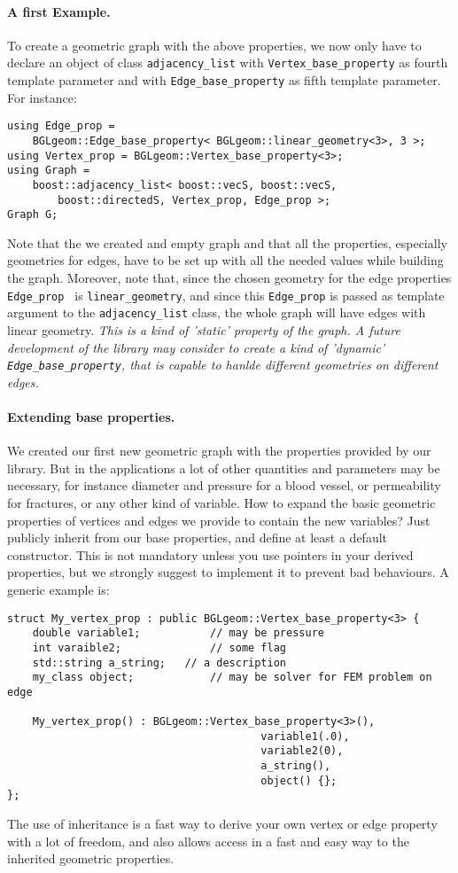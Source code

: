 \documentclass[11pt]{article} %
\newcommand{\classname}[1]{\texttt{#1}}
\begin{document}
		\paragraph{A first Example.} To create a geometric graph with the above properties, we now only have to declare an object of class \classname{adjacency\_list} with \classname{Vertex\_base\_property} as fourth template parameter and with \classname{Edge\_base\_property} as fifth template parameter. For instance:
\begin{lstlisting}[frame=single]
using Edge_prop = 
	BGLgeom::Edge_base_property< BGLgeom::linear_geometry<3>, 3 >;
using Vertex_prop = BGLgeom::Vertex_base_property<3>;
using Graph = 
	boost::adjacency_list< boost::vecS, boost::vecS, 
		boost::directedS, Vertex_prop, Edge_prop >;
Graph G;
\end{lstlisting}
		Note that the we created and empty graph and that all the properties, especially geometries for edges, have to be set up with all the needed values while building the graph. Moreover, note that, since the chosen geometry for the edge properties \texttt{Edge\_prop } is \texttt{linear\_geometry}, and since this \texttt{Edge\_prop} is passed as template argument to the \classname{adjacency\_list} class, the whole graph will have edges with linear geometry. \textit{This is a kind of 'static' property of the graph. A future development of the library may consider to create a kind of 'dynamic' \texttt{Edge\_base\_property}, that is capable to hanlde different geometries on different edges.} %
		\paragraph{Extending base properties.} We created our first new geometric graph with the properties provided by our library. But in the applications a lot of other quantities and parameters may be necessary, for instance diameter and pressure for a blood vessel, or permeability for fractures, or any other kind of variable. How to expand the basic geometric properties of vertices and edges we provide to contain the new variables? Just publicly inherit from our base properties, and define at least a default constructor. This is not mandatory unless you use pointers in your derived properties, but we strongly suggest to implement it to prevent bad behaviours. A generic example is:
\begin{lstlisting}[frame=single]
struct My_vertex_prop : public BGLgeom::Vertex_base_property<3> {
	double variable1;			// may be pressure
	int varaible2;				// some flag
	std::string a_string;	// a description
	my_class object;			// may be solver for FEM problem on edge
	
	My_vertex_prop() : BGLgeom::Vertex_base_property<3>(),
										variable1(.0),
										variable2(0),
										a_string(),
										object() {};	
};
\end{lstlisting}
		The use of inheritance is a fast way to derive your own vertex or edge property with a lot of freedom, and also allows access in a fast and easy way to the inherited geometric properties.
\end{document}
